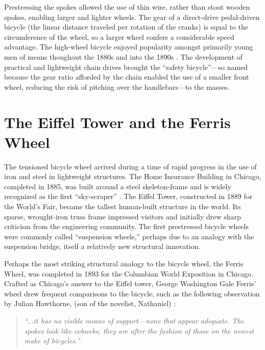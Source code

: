\documentclass[../thesis.tex]{subfiles}
\begin{document}
Prestressing the spokes allowed the use of thin wire, rather than stout wooden spokes, enabling larger and lighter wheels. The gear of a direct-drive pedal-driven bicycle (the linear distance traveled per rotation of the cranks) is equal to the circumference of the wheel, so a larger wheel confers a considerable speed advantage. The high-wheel bicycle enjoyed popularity amongst primarily young men of means thoughout the 1880s and into the 1890s \cite{Smith1972}. The development of practical and lightweight chain drives brought the ``safety bicycle''---so named because the gear ratio afforded by the chain enabled the use of a smaller front wheel, reducing the risk of pitching over the handlebars---to the masses.

\section{The Eiffel Tower and the Ferris Wheel}

The tensioned bicycle wheel arrived during a time of rapid progress in the use of iron and steel in lightweight structures. The Home Insurance Building in Chicago, completed in 1885, was built around a steel skeleton-frame and is widely recognized as the first ``sky-scraper'' . The Eiffel Tower, constructed in 1889 for the World's Fair, became the tallest human-built structure in the world. Its sparse, wrought-iron truss frame impressed visitors and initially drew sharp criticism from the engineering community. The first prestressed bicycle wheels were commonly called ``suspension wheels,'' perhaps due to an analogy with the suspension bridge, itself a relatively new structural innovation\cite{Sewall1896}.

Perhaps the most striking structural analogy to the bicycle wheel, the Ferris Wheel, was completed in 1893 for the Columbian World Exposition in Chicago. Crafted as Chicago's answer to the Eiffel tower, George Washington Gale Ferris' wheel drew frequent comparisons to the bicycle, such as the following observation by Julian Hawthorne, (son of the novelist, Nathaniel) \cite{Larson2004}:

\begin{quote}
\emph{``...it has no visible means of support---none that appear adequate. The spokes look like cobwebs; they are after the fashion of those on the newest make of bicycles.''}
\end{quote}
\end{document}
